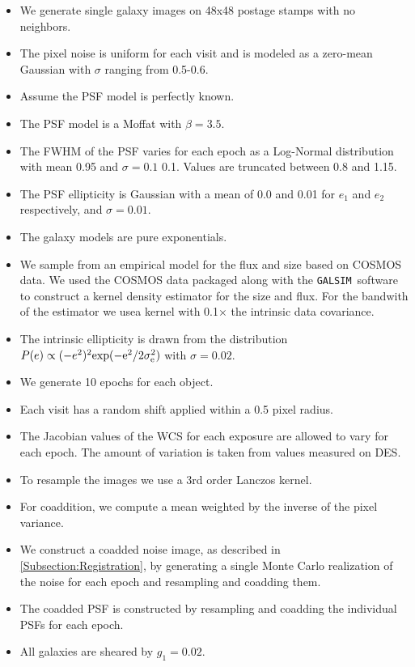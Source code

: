 \documentclass[fleqn,useAMS,usenatbib]{mnras}
\newcommand{\galsim}{\texttt{GALSIM}}
\begin{document}
\begin{itemize}
\item We generate single galaxy images on 48x48 postage stamps with no 
neighbors.
\item The pixel noise is uniform for each visit and is modeled as a zero-mean 
Gaussian with $\sigma$ ranging from 0.5-0.6.
\item Assume the PSF model is perfectly known.
\item The PSF model is a Moffat with $\beta=3.5$.
\item The \textsf{FWHM} of the PSF varies for each epoch as a Log-Normal 
distribution with mean 0.95 and $\sigma=0.1$ 0.1.  Values are truncated between 
0.8 and 1.15.
\item The PSF ellipticity is Gaussian with a mean of 0.0 and 0.01 for $e_1$ and 
$e_2$ respectively, and $\sigma=0.01$.
\item The galaxy models are pure exponentials.  
\item We sample from an empirical model for the flux and size based on 
\textsf{COSMOS} data.  We used the \textsf{COSMOS} data packaged along with the 
\galsim\ software to construct a kernel density estimator for the size and 
flux.  For the bandwith of the estimator we usea kernel with 0.1$\times$ the 
intrinsic data covariance.  
\item The intrinsic ellipticity is drawn from the distribution $P(e) \propto 
(-e^2)^2 \rm{exp}(-e^2/2\sigma_e^2)$ with $\sigma=0.02$.
\item We generate 10 epochs for each object.  
\item Each visit has a random shift applied within a 0.5 pixel radius.
\item The Jacobian values of the WCS for each exposure are allowed to vary for 
each epoch.  The amount of variation is taken from values measured on DES.
\item To resample the images we use a 3rd order Lanczos kernel.
\item For coaddition, we compute a mean weighted by the inverse of the pixel 
variance.
\item We construct a coadded noise image, as described in 
\ref{Subsection:Registration}, by generating a single Monte Carlo realization 
of the noise for each epoch and resampling and coadding them.
\item The coadded PSF is constructed by resampling and coadding the individual 
PSFs for each epoch.
\item All galaxies are sheared by $g_1=0.02$.
\end{itemize}
\end{document}
